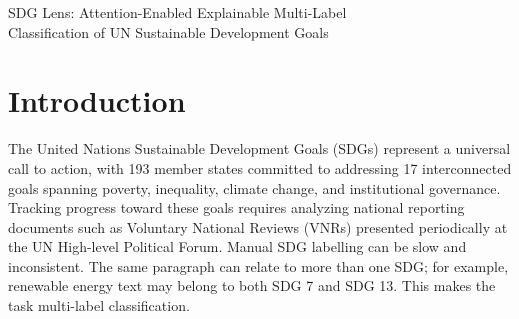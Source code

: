 \documentclass[12pt,a4paper]{article}
\begin{document}
\begin{center}
{\LARGE SDG Lens: Attention-Enabled Explainable Multi-Label\\
Classification of UN Sustainable Development Goals \par}

\vspace{1cm}
\end{center}

\begin{abstract}
We present SDG Lens, an attention-based multi-label classifier for identifying United Nations Sustainable Development Goals (SDGs) in UNDP's SDG Integration Corpus (SDGi) text. The system uses a partially fine-tuned BERT-family encoder (MiniLM) to predict one or more of the 17 SDG labels. To make the output easier to inspect, it also shows high-attention tokens for each prediction. We treat these tokens as proxy evidence, not as fully validated causal explanations.
We compare the MiniLM model with a TF-IDF + linear SVM-style baseline using 4,000 training examples. The TF-IDF baseline reaches micro-F1 = 0.700, macro-F1 = 0.697, and subset accuracy = 0.586. MiniLM reaches micro-F1 = 0.717, macro-F1 = 0.706, and subset accuracy = 0.670, outperforming the baseline across all metrics.
We also add a small manual inspection of top attention tokens on specific examples to check whether the model's highlights align with human expectations. The results show that SDG Lens is useful as a human-in-the-loop support tool, but it should not replace human judgement in policy or funding decisions.
\end{abstract}

\section{Introduction}

The United Nations Sustainable Development Goals (SDGs) represent a universal call to action, with 193 member states committed to addressing 17 interconnected goals spanning poverty, inequality, climate change, and institutional governance. Tracking progress toward these goals requires analyzing national reporting documents such as Voluntary National Reviews (VNRs) presented periodically at the UN High-level Political Forum. Manual SDG labelling can be slow and inconsistent. The same paragraph can relate to more than one SDG; for example, renewable energy text may belong to both SDG 7 and SDG 13. This makes the task multi-label classification.
\end{document}
